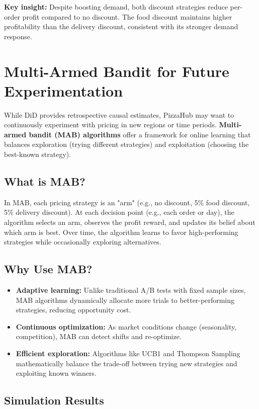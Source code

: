 \documentclass[12pt]{article}
\begin{document}
\textbf{Key insight:} Despite boosting demand, both discount strategies reduce per-order profit compared to no discount. The food discount maintains higher profitability than the delivery discount, consistent with its stronger demand response.

\section{Multi-Armed Bandit for Future Experimentation}

While DiD provides retrospective causal estimates, PizzaHub may want to continuously experiment with pricing in new regions or time periods. \textbf{Multi-armed bandit (MAB) algorithms} offer a framework for online learning that balances exploration (trying different strategies) and exploitation (choosing the best-known strategy).

\subsection{What is MAB?}

In MAB, each pricing strategy is an "arm" (e.g., no discount, 5\% food discount, 5\% delivery discount). At each decision point (e.g., each order or day), the algorithm selects an arm, observes the profit reward, and updates its belief about which arm is best. Over time, the algorithm learns to favor high-performing strategies while occasionally exploring alternatives.

\subsection{Why Use MAB?}

\begin{itemize}[nosep]
    \item \textbf{Adaptive learning:} Unlike traditional A/B tests with fixed sample sizes, MAB algorithms dynamically allocate more trials to better-performing strategies, reducing opportunity cost.
    \item \textbf{Continuous optimization:} As market conditions change (seasonality, competition), MAB can detect shifts and re-optimize.
    \item \textbf{Efficient exploration:} Algorithms like UCB1 and Thompson Sampling mathematically balance the trade-off between trying new strategies and exploiting known winners.
\end{itemize}

\subsection{Simulation Results}
\end{document}
